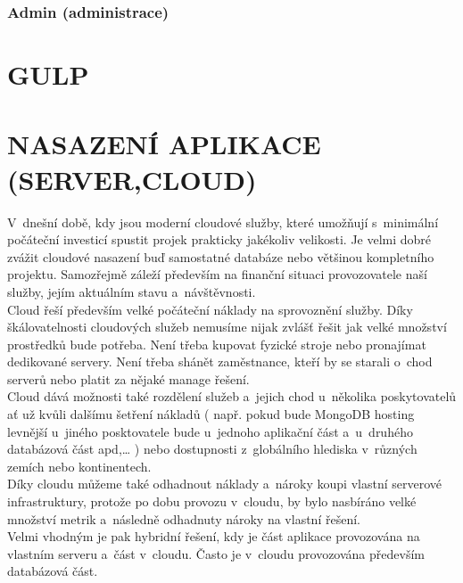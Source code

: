 \documentclass[a4paper,12pt,twoside,BCOR=10mm]{article}
\newcommand{\upc}[1]{\uppercase{#1}} %
\begin{document}
\subsubsection{Admin (administrace)}\label{sec:admin}


\section{\upc{Gulp}}

\section{\upc{Nasazení aplikace (server,cloud)}}
V~dnešní době, kdy jsou moderní cloudové služby, které umožňují s~minimální počáteční investicí spustit projek prakticky jakékoliv velikosti. Je velmi dobré zvážit cloudové nasazení buď samostatné databáze nebo většinou kompletního projektu. Samozřejmě záleží především na finanční situaci provozovatele naší služby, jejím aktuálním stavu a~návštěvnosti.\\

Cloud řeší především velké počáteční náklady na sprovoznění služby. Díky škálovatelnosti cloudových služeb nemusíme nijak zvlášť řešit jak velké množství prostředků bude potřeba. Není třeba kupovat fyzické stroje nebo pronajímat dedikované servery. Není třeba shánět zaměstnance, kteří by se starali o~chod serverů nebo platit za nějaké manage řešení.\\

Cloud dává možnosti také rozdělení služeb a~jejich chod u~několika poskytovatelů ať už kvůli dalšímu šetření nákladů ( např. pokud bude MongoDB hosting levnější u~jiného posktovatele bude u~jednoho aplikační část a~u~druhého databázová část apd,… ) nebo dostupnosti z~globálního hlediska v~různých zemích nebo kontinentech.\\

Díky cloudu můžeme také odhadnout náklady a~nároky koupi vlastní serverové infrastruktury, protože po dobu provozu v~cloudu, by bylo nasbíráno velké množství metrik a~následně odhadnuty nároky na vlastní řešení.\\

Velmi vhodným je pak hybridní řešení, kdy je část aplikace provozována na vlastním serveru a~část v~cloudu. Často je v~cloudu provozována především databázová část. \\
\end{document}
